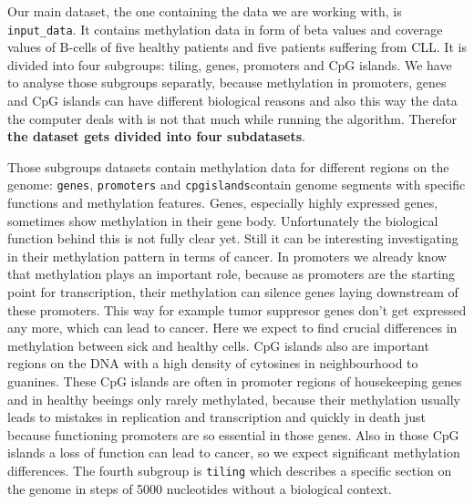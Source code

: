 \documentclass[]{article}
\newenvironment{Shaded}{\begin{snugshade}}{\end{snugshade}}
\newcommand{\StringTok}[1]{\textcolor[rgb]{0.31,0.60,0.02}{#1}}
\newcommand{\OperatorTok}[1]{\textcolor[rgb]{0.81,0.36,0.00}{\textbf{#1}}}
\newcommand{\NormalTok}[1]{#1}
\begin{document}
Our main dataset, the one containing the data we are working with, is
\texttt{input\_data}. It contains methylation data in form of beta
values and coverage values of B-cells of five healthy patients and five
patients suffering from CLL. It is divided into four subgroups: tiling,
genes, promoters and CpG islands. We have to analyse those subgroups
separatly, because methylation in promoters, genes and CpG islands can
have different biological reasons and also this way the data the
computer deals with is not that much while running the algorithm.
Therefor \textbf{the dataset gets divided into four subdatasets}.

\begin{Shaded}
\end{Shaded}

Those subgroups datasets contain methylation data for different regions
on the genome: \texttt{genes}, \texttt{promoters} and
\texttt{cpgislands}contain genome segments with specific functions and
methylation features. Genes, especially highly expressed genes,
sometimes show methylation in their gene body. Unfortunately the
biological function behind this is not fully clear yet. Still it can be
interesting investigating in their methylation pattern in terms of
cancer. In promoters we already know that methylation plays an important
role, because as promoters are the starting point for transcription,
their methylation can silence genes laying downstream of these
promoters. This way for example tumor suppresor genes don't get
expressed any more, which can lead to cancer. Here we expect to find
crucial differences in methylation between sick and healthy cells. CpG
islands also are important regions on the DNA with a high density of
cytosines in neighbourhood to guanines. These CpG islands are often in
promoter regions of housekeeping genes and in healthy beeings only
rarely methylated, because their methylation usually leads to mistakes
in replication and transcription and quickly in death just because
functioning promoters are so essential in those genes. Also in those CpG
islands a loss of function can lead to cancer, so we expect significant
methylation differences. The fourth subgroup is \texttt{tiling} which
describes a specific section on the genome in steps of 5000 nucleotides
without a biological context.
\end{document}
